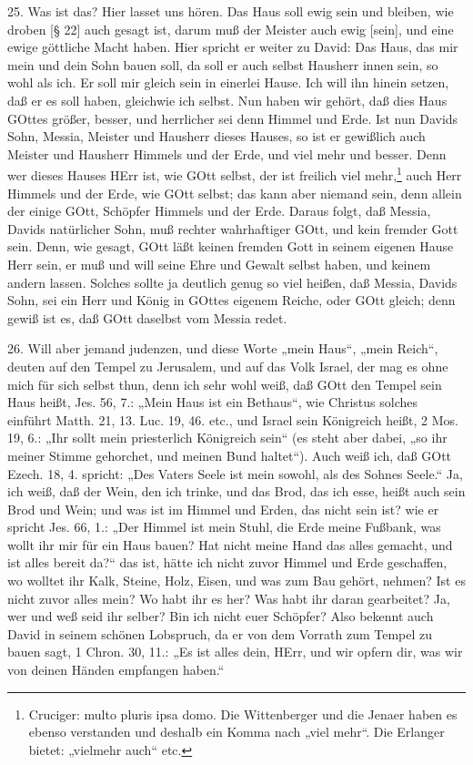 25. Was ist das? Hier lasset uns hören. Das Haus soll ewig sein und bleiben, wie droben [§ 22] auch gesagt ist, darum muß der Meister auch ewig [sein], und eine ewige göttliche Macht haben. Hier spricht er weiter zu David: Das Haus, das mir mein und dein Sohn bauen soll, da soll er auch selbst Hausherr innen sein, so wohl als ich. Er soll mir gleich sein in einerlei Hause. Ich will ihn hinein setzen, daß er es soll haben, gleichwie ich selbst. Nun haben wir gehört, daß dies Haus GOttes größer, besser, und herrlicher sei denn Himmel und Erde. Ist nun Davids Sohn, Messia, Meister und Hausherr dieses Hauses, so ist er gewißlich auch Meister und Hausherr Himmels und der Erde, und viel mehr und besser. Denn wer dieses Hauses HErr ist, wie GOtt selbst, der ist freilich viel mehr,\footnote{Cruciger: multo pluris ipsa domo. Die Wittenberger und die Jenaer haben es ebenso verstanden und deshalb ein Komma nach „viel mehr“. Die Erlanger bietet: „vielmehr auch“ etc.} auch Herr Himmels und der Erde, wie GOtt selbst; das kann aber niemand sein, denn allein der einige GOtt, Schöpfer Himmels und der Erde. Daraus folgt, daß Messia, Davids natürlicher Sohn, muß rechter wahrhaftiger GOtt, und kein fremder Gott sein. Denn, wie gesagt, GOtt läßt keinen fremden Gott in seinem eigenen Hause Herr sein, er muß und will seine Ehre und Gewalt selbst haben, und keinem andern lassen. Solches sollte ja deutlich genug so viel heißen, daß Messia, Davids Sohn, sei ein Herr und König in GOttes eigenem Reiche, oder GOtt gleich; denn gewiß ist es, daß GOtt daselbst vom Messia redet.

26. Will aber jemand judenzen, und diese Worte „mein Haus“, „mein Reich“, deuten auf den Tempel zu Jerusalem, und auf das Volk Israel, der mag es ohne mich für sich selbst thun, denn ich sehr wohl weiß, daß GOtt den Tempel sein Haus heißt, Jes. 56, 7.: „Mein Haus ist ein Bethaus“, wie Christus solches einführt Matth. 21, 13. Luc. 19, 46. etc., und Israel sein Königreich heißt, 2 Mos. 19, 6.: „Ihr sollt mein priesterlich Königreich sein“ (es steht aber dabei, „so ihr meiner Stimme gehorchet, und meinen Bund haltet“). Auch weiß ich, daß GOtt Ezech. 18, 4. spricht: „Des Vaters Seele ist mein sowohl, als des Sohnes Seele.“ Ja, ich weiß, daß der Wein, den ich trinke, und das Brod, das ich esse, heißt auch sein Brod und Wein; und was ist im Himmel und Erden, das nicht sein ist? wie er spricht Jes. 66, 1.: „Der Himmel ist mein Stuhl, die Erde meine Fußbank, was wollt ihr mir für ein Haus bauen? Hat nicht meine Hand das alles gemacht, und ist alles bereit da?“ das ist, hätte ich nicht zuvor Himmel und Erde geschaffen, wo wolltet ihr Kalk, Steine, Holz, Eisen, und was zum Bau gehört, nehmen? Ist es nicht zuvor alles mein? Wo habt ihr es her? Was habt ihr daran gearbeitet? Ja, wer und weß seid ihr selber? Bin ich nicht euer Schöpfer? Also bekennt auch David in seinem schönen Lobspruch, da er von dem Vorrath zum Tempel zu bauen sagt, 1 Chron. 30, 11.: „Es ist alles dein, HErr, und wir opfern dir, was wir von deinen Händen empfangen haben.“

